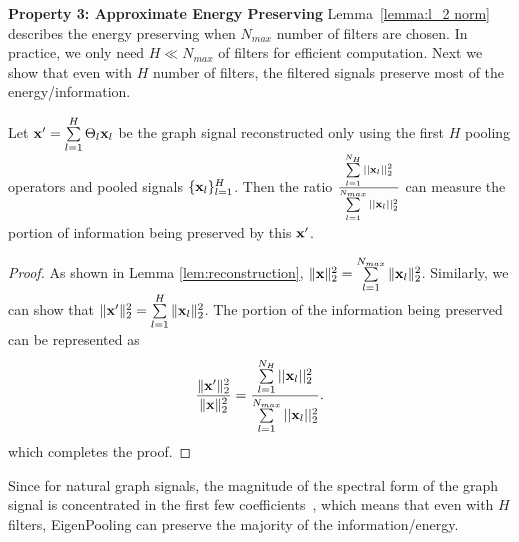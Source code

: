 \documentclass[sigconf]{acmart}
\begin{document}
\vspace{0.5em}
\noindent{}\textbf{Property 3: Approximate Energy Preserving} Lemma~\ref{lemma:l_2 norm} describes the energy preserving when $N_{max}$ number of filters are chosen. In practice, we only need $H \ll N_{max}$ of filters for efficient computation. Next we show that even with $H$ number of filters, the filtered signals preserve most of the energy/information.
\begin{theorem}
Let ${\bf x}' = \sum\limits_{l=1}^{H}  \Theta_l {\bf x}_l$ be the graph signal reconstructed only using the first $H$ pooling operators and pooled signals $\{{\bf x}_l\}_{l=1}^{H}$. Then the ratio $\frac{\sum\limits_{l=1}^{N_{H}} ||{\bf x}_l||^2_2}{\sum\limits_{l=1}^{N_{max}} ||{\bf x}_l||^2_2}$ can measure the portion of information being preserved by this ${\bf x}'$. 
\label{thm:energy_preserving_global}
\end{theorem}
\vspace{-1em}
\begin{proof}
As shown in Lemma \ref{lem:reconstruction}, $\|{\bf x}\|^2_2 = \sum\limits_{l=1}^{N_{max}} \|{\bf x}_l\|^2_2$. Similarly, we can show that $\|{\bf x}'\|^2_2 = \sum\limits_{l=1}^{H} \|{\bf x}_l\|^2_2$. The portion of the information being preserved can be represented as 
\begin{align} \label{thm:approximate_energy_preserving}
    \frac{\|{\bf x}'\|^2_2}{\|{\bf x}\|^2_2} = \frac{\sum\limits_{l=1}^{N_{H}} ||{\bf x}_l||^2_2}{\sum\limits_{l=1}^{N_{max}} ||{\bf x}_l||^2_2}.
\end{align}
which completes the proof.
\end{proof}
Since for natural graph signals, the magnitude of the spectral form of the graph signal is concentrated in the first few coefficients~\cite{sandryhaila2013discrete}, which means that even with $H$ filters, EigenPooling can preserve the majority of the information/energy.
\end{document}

